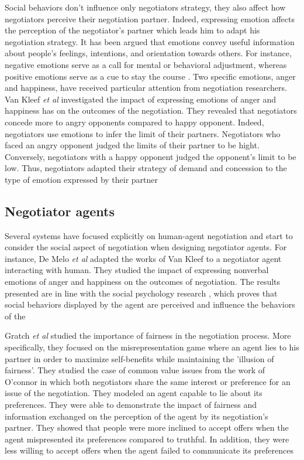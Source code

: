 \documentclass[runningheads,a4paper]{llncs}
\begin{document}
			Social behaviors don't influence only negotiators strategy, they also affect how negotiators perceive their negotiation partner. Indeed, expressing emotion affects the perception of the negotiator's partner which leads him to adapt his negotiation strategy. It has been argued that emotions convey useful information about people’s feelings, intentions, and orientation towards others. For instance, negative emotions serve as a call for	mental or behavioral adjustment, whereas positive emotions serve as a cue to stay the course \cite{cacioppo1999emotion}. 
			Two specific emotions, anger and happiness, have received particular attention from negotiation researchers. Van Kleef \textit{et al} investigated the impact of expressing emotions of anger and happiness has on the outcomes of the negotiation\cite{van2006power}. They revealed that negotiators concede more to angry opponents compared to happy opponent. Indeed, negotiators use emotions to infer the limit of their partners. 
			Negotiators who faced an angry opponent judged the limits of their partner to be hight. Conversely, negotiators with a happy opponent judged the opponent’s limit to be low. Thus, negotiators adapted their strategy of demand and concession to the type of emotion expressed by their partner
			
			\subsection{Negotiator agents}
			
			Several systems have focused explicitly on human-agent negotiation and start to consider the social aspect of negotiation when designing negotiator agents. For instance, De Melo \textit{et al} \cite{de2011effect} adapted the works of Van Kleef to a negotiator agent interacting with human. They studied the impact of expressing nonverbal emotions of anger and happiness on the outcomes of negotiation. The results presented are in line with the social psychology research \cite{van2006power}, which proves that social behaviors displayed by the agent are perceived and influence the behaviors of the
			
			 Gratch \textit{et al} studied the importance of fairness in the negotiation process. More specifically, they focused on the misrepresentation game where an agent lies to his partner in order to maximize self-benefits while maintaining the 'illusion of fairness'. 
			 They studied the case of common value issues from the work of O'connor \cite{o1997nasty} in which both negotiators share the same interest or preference for an issue of the negotiation. They modeled an agent capable to lie about its preferences. They were able to demonstrate the impact of fairness and information exchanged on the perception of the agent by its negotiation's partner. 
			 They showed that people were more inclined to accept offers when the agent mispresented its preferences compared to truthful. In addition, they were less willing to accept offers when the agent failed to communicate its preferences
			 
\end{document}

